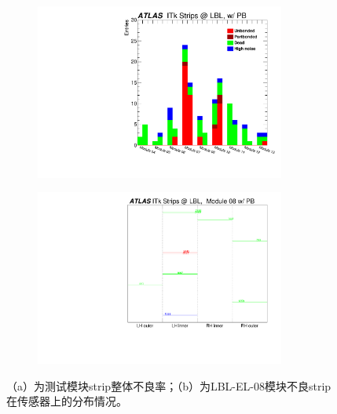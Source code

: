 \begin{figure}[h]
\centering
\begin{subfigure}[b]{0.45\textwidth}
\centering
 \includegraphics[width=0.9\textwidth,angle=-90]{fig/Hists_Bad_wPB.pdf}
 \caption{}
\end{subfigure}
\begin{subfigure}[b]{0.45\textwidth}
\centering
 \includegraphics[width=0.9\textwidth,angle=-90]{fig/BadDistr_LBL-EL-08_wPB.pdf}
 \caption{}
\end{subfigure}
\caption{（a）为测试模块strip整体不良率；（b）为LBL-EL-08模块不良strip在传感器上的分布情况。}
\label{fig:strips_bad_dist}
\end{figure}

